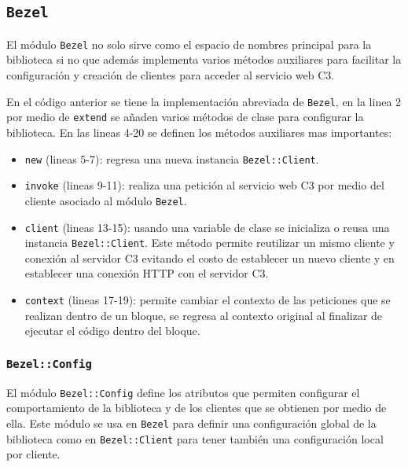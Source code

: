\subsection{\texttt{Bezel}}

El módulo \texttt{Bezel} no solo sirve como el espacio de nombres principal para la
biblioteca si no que además implementa varios métodos auxiliares para facilitar la
configuración y creación de clientes para acceder al servicio web C3.



En el código anterior se tiene la implementación abreviada de \texttt{Bezel},
en la linea 2 por medio de \texttt{extend} se añaden varios métodos de clase
para configurar la biblioteca. En las lineas 4-20 se definen los
métodos auxiliares mas importantes:

\begin{itemize}
\item \texttt{new} (lineas 5-7): regresa una nueva instancia \texttt{Bezel::Client}.
\item \texttt{invoke} (lineas 9-11): realiza una petición al servicio web C3
  por medio del cliente asociado al módulo \texttt{Bezel}.
\item \texttt{client} (lineas 13-15): usando una variable de clase se inicializa o
  reusa una instancia \texttt{Bezel::Client}. Este método permite reutilizar un
  mismo cliente y conexión al servidor C3 evitando el costo de establecer un
  nuevo cliente y en establecer una conexión HTTP con el servidor C3.
\item \texttt{context} (lineas 17-19): permite cambiar el contexto de las
  peticiones que se realizan dentro de un bloque, se regresa al contexto original
  al finalizar de ejecutar el código dentro del bloque.
\end{itemize}

\subsubsection{\texttt{Bezel::Config}}

El módulo \texttt{Bezel::Config} define los atributos que permiten configurar
el comportamiento de la biblioteca y de los clientes que se obtienen por medio
de ella. Este módulo se usa en \texttt{Bezel} para definir una configuración global
de la biblioteca como en \texttt{Bezel::Client} para tener también una configuración
local por cliente.



